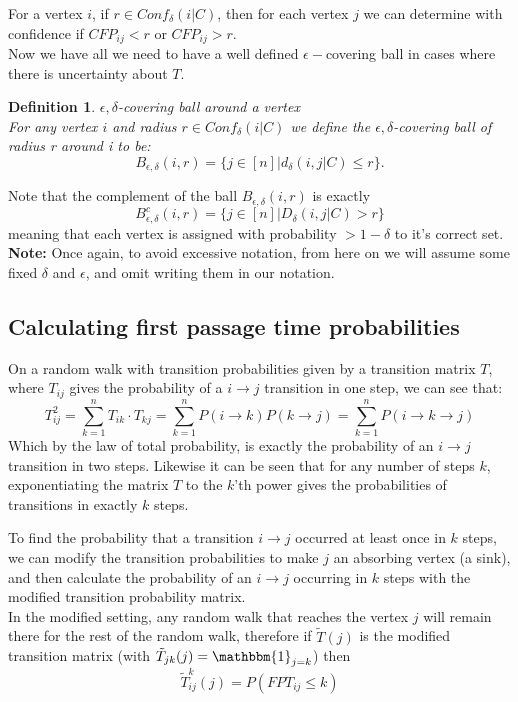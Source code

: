\documentclass{article}
\newtheorem{definition}{Definition}
\begin{document}
For a vertex $i$, if $r\in Conf_\delta(i|C)$, then for each vertex $j$ we can determine with confidence if $CFP_{ij}<r$ or $CFP_{ij}>r$.\\
Now we have all we need to have a well defined $\epsilon-$covering ball in cases where there is uncertainty about $T$.
\begin{definition}
    $\epsilon, \delta$-covering ball around a vertex \\
    For any vertex $i$ and radius $r\in Conf_\delta(i|C)$ we define the \textit{$\epsilon, \delta$-covering ball of radius r around i} to be:
\[
    B_{\epsilon, \delta}(i,r) = \{j\in [n] | d_\delta(i,j|C)\leq r\} 
.\]
\end{definition}
Note that the complement of the ball $B_{\epsilon, \delta}(i,r)$ is exactly
\[
  B^{c}_{\epsilon, \delta}(i,r) = \{j\in [n] | D_\delta(i,j|C)>r\}
\] 
meaning that each vertex is assigned with probability $>1-\delta$ to it's correct set. 
\textbf{Note:} Once again, to avoid excessive notation, from here on we will assume some fixed $\delta$ and $\epsilon$, and omit writing them in our notation.

\subsection{Calculating first passage time probabilities}
On a random walk with transition probabilities given by a transition matrix $T$, where $T_{ij}$ gives the probability of a $i \rightarrow j$ transition in one step, we can see that:
\begin{equation}\label{Tsq}
    T^2_{ij} = \sum_{k=1}^n T_{ik}\cdot  T_{kj} = \sum_{k=1}^n P(i \rightarrow k) P(k\rightarrow j) = \sum_{k=1}^n P(i \rightarrow k\rightarrow j)
\end{equation}
Which by the law of total probability, is exactly the probability of an $i \rightarrow j$ transition in two steps.
Likewise it can be seen that for any number of steps $k$, exponentiating the matrix $T$ to the $k$'th power gives the probabilities of transitions in exactly $k$ steps.

To find the probability that a transition $i \rightarrow j$ occurred at least once in $k$ steps, we can modify the transition probabilities to make $j$ an absorbing vertex (a sink), and then calculate the probability of an $i \rightarrow j$ occurring in $k$ steps with the modified transition probability matrix.\\
In the modified setting, any random walk that reaches the vertex $j$ will remain there for the rest of the random walk, therefore if $\tilde{T}(j)$ is the modified transition matrix (with $\tilde{T}_{jk}(j)=\mathbbm{1}_{j=k}$) then 
\begin{equation}\label{T_ij_calc}
    \tilde{T}_{ij}^{k}(j) = P(FPT_{ij}\leq k)
\end{equation}
\end{document}
